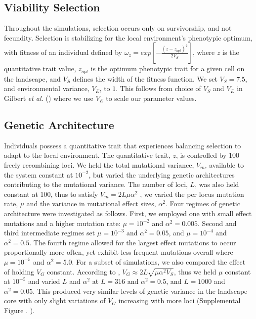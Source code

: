  
\subsection{Viability Selection}
Throughout the simulations, selection occurs only on survivorship, and not fecundity. Selection is stabilizing for the local environment's phenotypic optimum, with fitness of an individual defined by $\omega_z = exp[-\frac{(z-z_{opt})^2}{2V_S}]$, where $z$ is the quantitative trait value, $z_{opt}$ is the optimum phenotypic trait for a given cell on the landscape, and $V_S$ defines the width of the fitness function. We set $V_S = 7.5$, and environmental variance, $V_E$, to $1$. This follows from choice of $V_S$ and $V_E$ in Gilbert \emph{et al.} () where we use $V_E$ to scale our parameter values.%


\subsection{Genetic Architecture}
Individuals possess a quantitative trait that experiences balancing selection to adapt to the local environment. The quantitative trait, $z$, is controlled by 100 freely recombining loci. We held the total mutational variance, $V_m$, available to the system constant at $10^{-2}$, but varied the underlying genetic architectures contributing to the mutational variance. The number of loci, $L$, was also held constant at 100, thus to satisfy $V_m = 2 L \mu \alpha^2$ \citep{Lande:1975}, we varied the per locus mutation rate, $\mu$ and the variance in mutational effect sizes, $\alpha^2$. Four regimes of genetic architecture were investigated as follows. First, we employed one with small effect mutations and a higher mutation rate: $\mu = 10^{-2}$ and $\alpha^2 = 0.005$. Second and third intermediate regimes set $\mu = 10^{-3}$ and $\alpha^2 = 0.05$, and $\mu = 10^{-4}$ and $\alpha^2 = 0.5$. The fourth regime allowed for the largest effect mutations to occur proportionally more often, yet exhibit less frequent mutations overall where $\mu = 10^{-5}$ and $\alpha^2 = 5.0$. \color{red}For a subset of simulations, we also compared the effect of holding $V_G$ constant. According to \citet{Johnson:2005}, $V_G \approx 2 L \sqrt{\mu \alpha^2 V_S}$, thus we held $\mu$ constant at $10^{-5}$ and varied $L$ and $\alpha^2$ at $L = 316$ and $\alpha^2 = 0.5$, and $L = 1000$ and $\alpha^2 = 0.05$. This produced very similar levels of genetic variance in the landscape core with only slight variations of $V_G$ increasing with more loci (Supplemental Figure . ). \color{black} 

